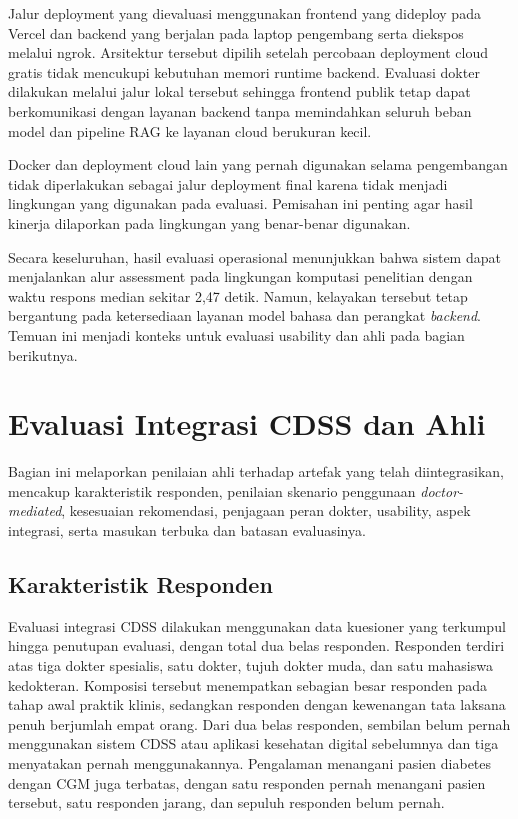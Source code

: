 Jalur deployment yang dievaluasi menggunakan frontend yang dideploy pada Vercel dan backend yang berjalan pada laptop pengembang serta diekspos melalui
ngrok. Arsitektur tersebut dipilih setelah percobaan deployment cloud gratis tidak mencukupi kebutuhan memori runtime backend. Evaluasi dokter dilakukan
melalui jalur lokal tersebut sehingga frontend publik tetap dapat berkomunikasi dengan layanan backend tanpa memindahkan seluruh beban model dan pipeline
RAG ke layanan cloud berukuran kecil.

Docker dan deployment cloud lain yang pernah digunakan selama pengembangan tidak diperlakukan sebagai jalur deployment final karena tidak menjadi lingkungan
yang digunakan pada evaluasi. Pemisahan ini penting agar hasil kinerja dilaporkan pada lingkungan yang benar-benar digunakan.

Secara keseluruhan, hasil evaluasi operasional menunjukkan bahwa sistem dapat menjalankan alur assessment pada lingkungan komputasi penelitian dengan waktu
respons median sekitar 2,47 detik. Namun, kelayakan tersebut tetap bergantung pada ketersediaan layanan model bahasa dan perangkat \textit{backend}. Temuan ini
menjadi konteks untuk evaluasi usability dan ahli pada bagian berikutnya.

\section{Evaluasi Integrasi CDSS dan Ahli}
\label{sec:bab6-evaluasi-integrasi-cdss-ahli}

Bagian ini melaporkan penilaian ahli terhadap artefak yang telah diintegrasikan, mencakup karakteristik responden, penilaian skenario penggunaan
\textit{doctor-mediated}, kesesuaian rekomendasi, penjagaan peran dokter, usability, aspek integrasi, serta masukan terbuka dan batasan evaluasinya.

\subsection{Karakteristik Responden}
\label{subsec:bab6-karakteristik-responden}

Evaluasi integrasi CDSS dilakukan menggunakan data kuesioner yang terkumpul hingga penutupan evaluasi, dengan total dua belas responden. Responden terdiri
atas tiga dokter spesialis, satu dokter, tujuh dokter muda, dan satu mahasiswa kedokteran. Komposisi tersebut menempatkan sebagian besar responden pada tahap
awal praktik klinis, sedangkan responden dengan kewenangan tata laksana penuh berjumlah empat orang. Dari dua belas responden, sembilan belum pernah
menggunakan sistem CDSS atau aplikasi kesehatan digital sebelumnya dan tiga menyatakan pernah menggunakannya. Pengalaman menangani pasien diabetes dengan CGM
juga terbatas, dengan satu responden pernah menangani pasien tersebut, satu responden jarang, dan sepuluh responden belum pernah.

